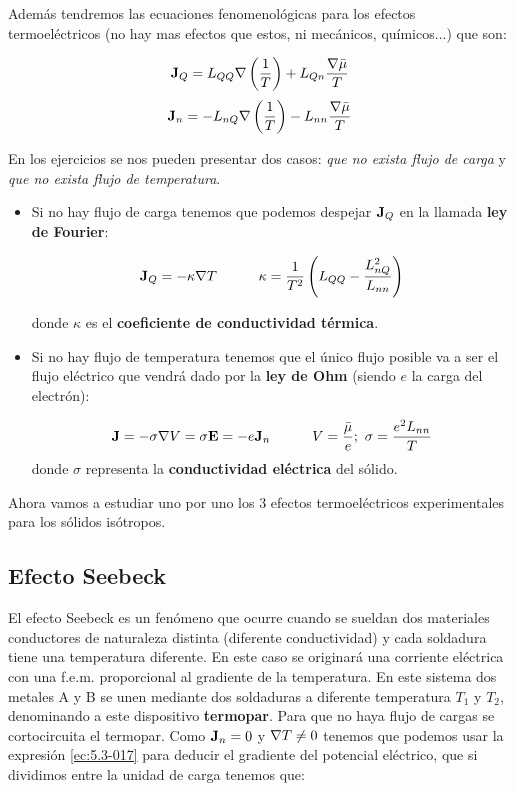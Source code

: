 \documentclass[12pt,a4paper,oneside]{book}
\begin{document}
Además tendremos las ecuaciones fenomenológicas para los efectos termoeléctricos (no hay mas efectos que estos, ni mecánicos, químicos...) que son:

\begin{equation}
\textbf{J}_Q = L_{QQ} \nabla \left( \dfrac{1}{T} \right)  + L_{Qn} \dfrac{\nabla \bar{\mu}}{T}
\label{ec:5.3-016}
\end{equation} 
\begin{equation}
\textbf{J}_n = - L_{nQ} \nabla \left( \dfrac{1}{T} \right)  - L_{nn} \dfrac{\nabla \bar{\mu}}{T} \label{ec:5.3-017}
\end{equation}

En los ejercicios se nos pueden presentar dos casos: \textit{que no exista flujo de carga} y \textit{que no exista flujo de temperatura}. 

\begin{itemize}
\item Si no hay flujo de carga tenemos que podemos despejar $\textbf{J}_Q$ en la llamada \textbf{ley de Fourier}:

\begin{equation}
\textbf{J}_Q = - \kappa \nabla T \quad \quad \quad \kappa = \dfrac{1}{T^2} \left( L_{QQ} - \dfrac{L_{nQ}^2}{L_{nn}}  \right)
\end{equation}

donde $\kappa$ es el \textbf{coeficiente de conductividad térmica}.

\item Si no hay flujo de temperatura tenemos que el único flujo posible va a ser el flujo eléctrico que vendrá dado por la \textbf{ley de Ohm} (siendo $e$ la carga del electrón):



\begin{equation}
\textbf{J} = - \sigma \nabla V = \sigma \textbf{E}  = - e \textbf{J}_n \quad \quad \quad V = \dfrac{\bar{\mu}}{e}; \ \sigma = \dfrac{e^2 L_{nn}}{T}
\end{equation}
donde $\sigma$ representa la \textbf{conductividad eléctrica} del sólido.

\end{itemize}

Ahora vamos a estudiar uno por uno los 3 efectos termoeléctricos experimentales para los sólidos isótropos.

\subsection{Efecto Seebeck}

El efecto Seebeck es un fenómeno que ocurre cuando se sueldan dos materiales conductores de naturaleza distinta (diferente conductividad) y cada soldadura tiene una temperatura diferente. En este caso se originará una corriente eléctrica con una f.e.m. proporcional al gradiente de la temperatura. En este sistema dos metales A y B se unen mediante dos soldaduras a diferente temperatura $T_1$ y $T_2$, denominando a este dispositivo \textbf{termopar}. Para que no haya flujo de cargas se cortocircuita el termopar. Como $\textbf{J}_n = 0$ y $\nabla T \neq 0$ tenemos que podemos usar la expresión \ref{ec:5.3-017} para deducir el gradiente del potencial eléctrico, que si dividimos entre la unidad de carga tenemos que:
\end{document}
